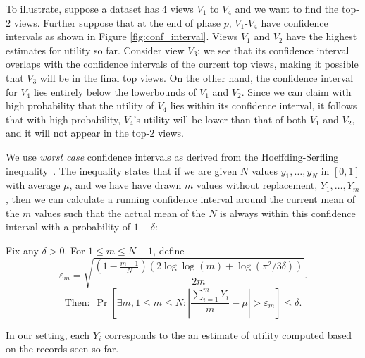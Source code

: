 To illustrate, suppose a dataset has 4 views $V_1$ to $V_4$ and we want to find the top-$2$ views.
Further suppose that at the end of phase $p$,
$V_1$-$V_4$ have confidence intervals as shown in Figure \ref{fig:conf_interval}.
Views $V_1$ and $V_2$ have the highest estimates for utility so far.
Consider view $V_3$; we see that its confidence interval overlaps with the
confidence intervals of the current top views, making it possible
that $V_3$ will be in the final top views. On the other hand, the confidence
interval for $V_4$ lies entirely below the lowerbounds of $V_1$ and $V_2$.
Since we can claim with high probability
that the utility of $V_4$ lies within its confidence interval, it follows that
with high probability, $V_4$'s utility will be lower than that of both $V_1$ and
$V_2$, and it will not appear in the top-$2$ views.


We use {\it worst case} confidence intervals as derived from
the Hoeffding-Serfling inequality~\cite{serfling1974probability}.
The inequality states that if we are given $N$ values $y_1, \ldots, y_N$ in 
$[0, 1]$ with average $\mu$, and we have have drawn $m$ values without replacement, $Y_1, \ldots, Y_m$, 
then we can calculate a running confidence interval around the current mean 
of the $m$ values such that the actual mean of the $N$
is always within this confidence interval with a probability of $1 - \delta$:
\begin{theorem}
\label{thm:hs}
Fix any $\delta > 0$. For $1 \le m \le N-1$, define
{\small $$
\varepsilon_m = \sqrt{\frac{(1-\frac{m-1}N)(2\log \log (m) + \log(\pi^2/3\delta))}{2m}}.
$$
$$
\textrm{Then:} \ \   \Pr\left[ \exists m, 1 \le m \le N : 
  \left|\frac{\sum_{i=1}^m Y_i}{m} - \mu\right| > \varepsilon_m \right] 
\le \delta.
$$
}

\end{theorem}
In our setting, each $Y_i$ corresponds to the an estimate of utility computed based on the
records seen so far. 

